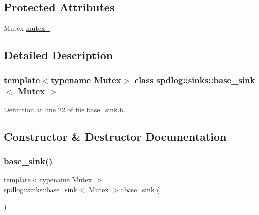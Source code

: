 \subsection*{Protected Attributes}
\begin{DoxyCompactItemize}
\item 
Mutex \hyperlink{classspdlog_1_1sinks_1_1base__sink_a929422554ce18d8bffd9b4d75cc7acf3}{mutex\+\_\+}
\end{DoxyCompactItemize}


\subsection{Detailed Description}
\subsubsection*{template$<$typename Mutex$>$\newline
class spdlog\+::sinks\+::base\+\_\+sink$<$ Mutex $>$}



Definition at line 22 of file base\+\_\+sink.\+h.



\subsection{Constructor \& Destructor Documentation}
\mbox{\label{classspdlog_1_1sinks_1_1base__sink_a38658ba620d110065ce93e178b9ec60e}} 
\subsubsection{\texorpdfstring{base\+\_\+sink()}{base\_sink()}\hspace{0.1cm}{\footnotesize\ttfamily [1/2]}}
{\footnotesize\ttfamily template$<$typename Mutex $>$ \\
\hyperlink{classspdlog_1_1sinks_1_1base__sink}{spdlog\+::sinks\+::base\+\_\+sink}$<$ Mutex $>$\+::\hyperlink{classspdlog_1_1sinks_1_1base__sink}{base\+\_\+sink} (\begin{DoxyParamCaption}{ }\end{DoxyParamCaption})\hspace{0.3cm}{\ttfamily [default]}}

